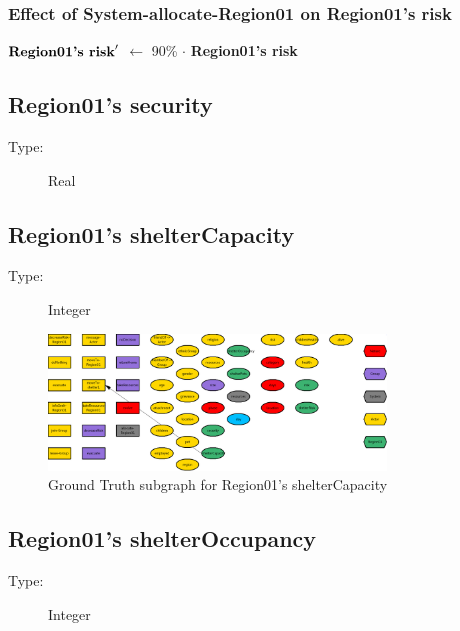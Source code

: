 \documentclass{article}%
\begin{document}
%
\subsubsection{Effect of System{-}allocate{-}Region01 on Region01's risk}%
\label{ssubsec:Effect of System{-}allocate{-}Region01 on Region01's risk}%
\begin{flushleft}%
$\mbox{\textbf{Region01's risk}} '$%
$\leftarrow$%
90\%%
$\cdot$%
\textbf{Region01's risk}%
\end{flushleft}

%
\subsection{Region01's security}%
\label{subsec:Region01's security}%
\begin{description}%
\item[Type:]%
Real%
\end{description}

%
\subsection{Region01's shelterCapacity}%
\label{subsec:Region01's shelterCapacity}%
\begin{description}%
\item[Type:]%
Integer%
\end{description}%


\begin{figure}[ht]%
\centering%
\includegraphics[width=0.8\textwidth]{images/shelterCapacityOfRegion01.png}%
\caption{Ground Truth subgraph for Region01's shelterCapacity}%
\end{figure}

%
\subsection{Region01's shelterOccupancy}%
\label{subsec:Region01's shelterOccupancy}%
\begin{description}%
\item[Type:]%
Integer%
\end{description}%
\end{document}
